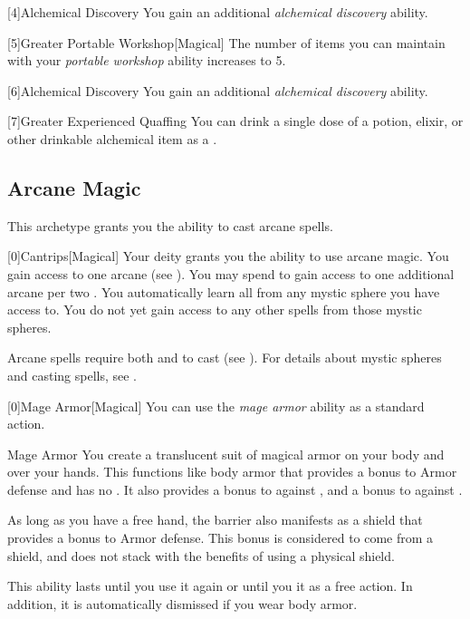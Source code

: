         [4]{Alchemical Discovery} You gain an additional \textit{alchemical discovery} ability.

        [5]{Greater Portable Workshop}[Magical] The number of items you can maintain with your \textit{portable workshop} ability increases to 5.

        [6]{Alchemical Discovery} You gain an additional \textit{alchemical discovery} ability.

        [7]{Greater Experienced Quaffing} You can drink a single dose of a potion, elixir, or other drinkable alchemical item as a .

    \newpage
    \subsection{Arcane Magic}
        This archetype grants you the ability to cast arcane spells.

        [0]{Cantrips}[Magical]
        Your deity grants you the ability to use arcane magic.
        You gain access to one arcane  (see ).
        You may spend  to gain access to one additional arcane  per two .
        You automatically learn all  from any mystic sphere you have access to.
        You do not yet gain access to any other spells from those mystic spheres.

        Arcane spells require both  and  to cast (see ).
        For details about mystic spheres and casting spells, see .

        [0]{Mage Armor}[Magical] You can use the \textit{mage armor} ability as a standard action.
        \begin{freeability}{Mage Armor}
            You create a translucent suit of magical armor on your body and over your hands.
            This functions like body armor that provides a  bonus to Armor defense and has no .
            It also provides a  bonus to  against , and a  bonus to  against .

            As long as you have a free hand, the barrier also manifests as a shield that provides a  bonus to Armor defense.
            This bonus is considered to come from a shield, and does not stack with the benefits of using a physical shield.

            This ability lasts until you use it again or until you  it as a free action.
            In addition, it is automatically dismissed if you wear body armor.
        \end{freeability}

